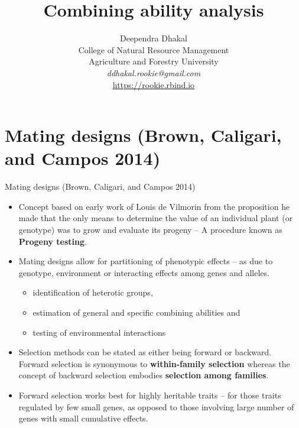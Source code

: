 \documentclass[11pt,dvipsnames,ignorenonframetext,aspectratio=169]{beamer}
\title[]{Combining ability analysis}
\author[
        Deependra Dhakal\\
College of Natural Resource Management\\
Agriculture and Forestry University\\
\textit{ddhakal.rookie@gmail.com}\\
\url{https://rookie.rbind.io}
    ]{Deependra Dhakal\\
College of Natural Resource Management\\
Agriculture and Forestry University\\
\textit{ddhakal.rookie@gmail.com}\\
\url{https://rookie.rbind.io}}
\date[
      
  ]{
    }
\providecommand{\tightlist}{%
  \setlength{\itemsep}{0pt}\setlength{\parskip}{0pt}}
\begin{document}
  \begin{frame}[plain]
  \titlepage
  \end{frame}



\hypertarget{mating-designs-brown2014plantbreeding}{%
\section{Mating designs (Brown, Caligari, and Campos
2014)}\label{mating-designs-brown2014plantbreeding}}

\begin{frame}{Mating designs (Brown, Caligari, and Campos 2014)}
\begin{itemize}
\tightlist
\item
  Concept based on early work of Louis de Vilmorin from the proposition
  he made that the only means to determine the value of an individual
  plant (or genotype) was to grow and evaluate its progeny -- A
  procedure known as \textbf{Progeny testing}.
\item
  Mating designs allow for partitioning of phenotypic effects -- as due
  to genotype, environment or interacting effects among genes and
  alleles.

  \begin{itemize}
  \tightlist
  \item
    identification of heterotic groups,
  \item
    estimation of general and specific combining abilities and
  \item
    testing of environmental interactions
  \end{itemize}
\item
  Selection methods can be stated as either being forward or backward.
  Forward selection is synonymous to \textbf{within-family selection}
  whereas the concept of backward selection embodies \textbf{selection
  among families}.
\item
  Forward selection works best for highly heritable traits -- for those
  traits regulated by few small genes, as opposed to those involving
  large number of genes with small cumulative effects.
\end{itemize}
\end{frame}
\end{document}
